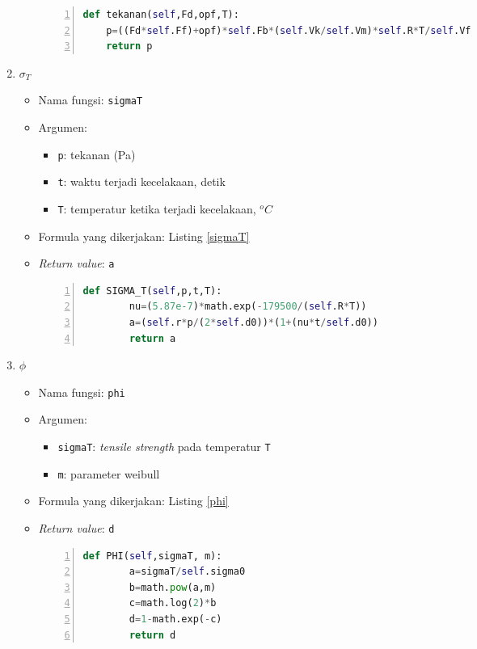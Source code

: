 \documentclass[a4paper,11pt]{report}
\begin{document}
\begin{enumerate}
\begin{itemize}
\scriptsize
\begin{lstlisting}[language=python, numbers=left, numberstyle=\tiny, caption=Fungsi tekanan, showstringspaces=false, label=tekanan]
def tekanan(self,Fd,opf,T):
	p=((Fd*self.Ff)+opf)*self.Fb*(self.Vk/self.Vm)*self.R*T/self.Vf
	return p
\end{lstlisting}
\normalsize
  \end{itemize}
  
  \item $\sigma_T$
  \begin{itemize}
    \item Nama fungsi: \texttt{sigmaT}
    \item Argumen:
    \begin{itemize}
      \item \texttt{p}: tekanan (Pa)
      \item \texttt{t}: waktu terjadi kecelakaan, detik
      \item \texttt{T}: temperatur ketika terjadi kecelakaan, $^{o}C$
    \end{itemize}
    \item Formula yang dikerjakan: Listing \ref{sigmaT}
    \item \textit{Return value}: \texttt{a}
    
\scriptsize
\begin{lstlisting}[language=python, numbers=left, numberstyle=\tiny, caption=Fungsi \textit{tensile strength} pada temperatur T, showstringspaces=false, label=sigmaT]
	def SIGMA_T(self,p,t,T):
		nu=(5.87e-7)*math.exp(-179500/(self.R*T))
		a=(self.r*p/(2*self.d0))*(1+(nu*t/self.d0))
		return a
\end{lstlisting}
\normalsize
  \end{itemize}
  
  \item $\phi$
  \begin{itemize}
    \item Nama fungsi: \texttt{phi}
    \item Argumen:
    \begin{itemize}
      \item \texttt{sigmaT}: \textit{tensile strength} pada temperatur \texttt{T}
      \item \texttt{m}: parameter weibull
    \end{itemize}
    \item Formula yang dikerjakan: Listing \ref{phi}
    \item \textit{Return value}: \texttt{d}
    
\scriptsize
\begin{lstlisting}[language=python, numbers=left, numberstyle=\tiny, caption=Fungsi fraksi gagal partikel triso, showstringspaces=false, label=phi]
	def PHI(self,sigmaT, m):
		a=sigmaT/self.sigma0
		b=math.pow(a,m)
		c=math.log(2)*b
		d=1-math.exp(-c)
		return d
\end{lstlisting}
\normalsize
  \end{itemize}
\end{enumerate}
\end{document}
